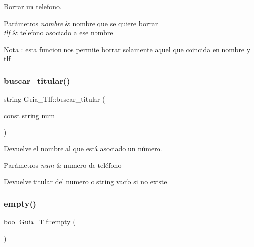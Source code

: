 Borrar un telefono. 


\begin{DoxyParams}{Parámetros}
{\em nombre} & nombre que se quiere borrar \\
\hline
{\em tlf} & telefono asociado a ese nombre \\
\hline
\end{DoxyParams}
\begin{DoxyNote}{Nota}
\+: esta funcion nos permite borrar solamente aquel que coincida en nombre y tlf 
\end{DoxyNote}
\mbox{\label{classGuia__Tlf_a69d5ad982b44abf190dcdb3b8601e6ef}} 
\subsubsection{\texorpdfstring{buscar\+\_\+titular()}{buscar\_titular()}}
{\footnotesize\ttfamily string Guia\+\_\+\+Tlf\+::buscar\+\_\+titular (\begin{DoxyParamCaption}\item[{const string}]{num }\end{DoxyParamCaption})}



Devuelve el nombre al que está asociado un número. 


\begin{DoxyParams}{Parámetros}
{\em num} & numero de teléfono \\
\hline
\end{DoxyParams}
\begin{DoxyReturn}{Devuelve}
titular del numero o string vacío si no existe 
\end{DoxyReturn}
\mbox{\label{classGuia__Tlf_abf231ca9dd472519d893d2de91a7a486}} 
\subsubsection{\texorpdfstring{empty()}{empty()}}
{\footnotesize\ttfamily bool Guia\+\_\+\+Tlf\+::empty (\begin{DoxyParamCaption}{ }\end{DoxyParamCaption})}



